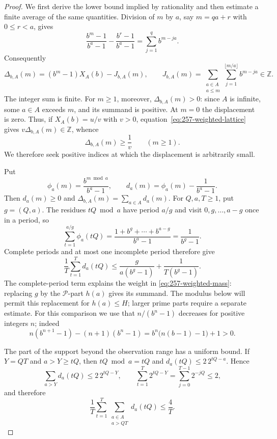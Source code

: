 \documentclass[11pt]{article}
\theoremstyle{plain}
\theoremstyle{definition}
\theoremstyle{remark}
\begin{document}
\begin{proof}
We first derive the lower bound implied by rationality and then
estimate a finite average of the same quantities. Division of $m$ by $a$, say $m=qa+r$ with
$0\le r<a$, gives
\[
 \frac{b^m-1}{b^a-1}-\frac{b^r-1}{b^a-1}
   =\sum_{j=1}^{q}b^{m-ja}.
\]
Consequently
\begin{equation}\label{eq:257-weighted-lattice}
 \Delta_{b,A}(m)=(b^m-1)X_A(b)-J_{b,A}(m),
 \qquad
 J_{b,A}(m)=
 \sum_{\substack{a\in A\\a\le m}}
 \sum_{j=1}^{\lfloor m/a\rfloor}b^{m-ja}\in\mathbb Z.
\end{equation}
The integer sum is finite.  For $m\ge1$, moreover,
$\Delta_{b,A}(m)>0$: since $A$ is infinite, some $a\in A$ exceeds $m$,
and its summand is positive.  At $m=0$ the displacement is zero.  Thus, if
$X_A(b)=u/v$ with $v>0$, equation~\eqref{eq:257-weighted-lattice} gives
$v\Delta_{b,A}(m)\in\mathbb Z$, whence
\begin{equation}\label{eq:257-weighted-gap}
 \Delta_{b,A}(m)\ge \frac1v\qquad(m\ge1).
\end{equation}
We therefore seek positive indices at which the displacement is
arbitrarily small.

Put
\[
 \phi_a(m)=\frac{b^{m\bmod a}}{b^a-1},
 \qquad
 d_a(m)=\phi_a(m)-\frac1{b^a-1}.
\]
Then $d_a(m)\ge0$ and $\Delta_{b,A}(m)=\sum_{a\in A}d_a(m)$.
For $Q,a,T\ge1$, put $g=(Q,a)$.  The residues $tQ\bmod a$ have period
$a/g$ and visit $0,g,\ldots,a-g$ once in a period, so
\[
 \sum_{t=1}^{a/g}\phi_a(tQ)
 =\frac{1+b^g+\cdots+b^{a-g}}{b^a-1}
 =\frac1{b^g-1}.
\]
Complete periods and at most one incomplete period therefore give
\begin{equation}\label{eq:257-weighted-gcd-average}
 \frac1T\sum_{t=1}^{T}d_a(tQ)
 \le \frac{g}{a(b^g-1)}+\frac1{T(b^g-1)}.
\end{equation}
The complete-period term explains the weight in
\eqref{eq:257-weighted-mass}: replacing $g$ by the $\mathcal P$-part
$h(a)$ gives its summand. The modulus below will permit this replacement
for $h(a)\le H$; larger prime parts require a separate estimate.
For this comparison we use that $n/(b^n-1)$ decreases for positive
integers $n$; indeed
\[
 n(b^{n+1}-1)-(n+1)(b^n-1)
 =b^n\bigl(n(b-1)-1\bigr)+1>0.
\]

The part of the support beyond the observation range has a uniform bound.  If
$Y=QT$ and $a>Y\ge tQ$, then $tQ\bmod a=tQ$ and
$d_a(tQ)\le2\,2^{tQ-a}$.  Hence
\[
 \sum_{a>Y}d_a(tQ)\le2\,2^{tQ-Y},
 \qquad
 \sum_{t=1}^{T}2^{tQ-Y}
 =\sum_{j=0}^{T-1}2^{-jQ}\le2,
\]
and therefore
\begin{equation}\label{eq:257-weighted-outer}
 \frac1T\sum_{t=1}^{T}
 \sum_{\substack{a\in A\\a>QT}}d_a(tQ)\le\frac4T.
\end{equation}


\end{proof}
\end{document}
